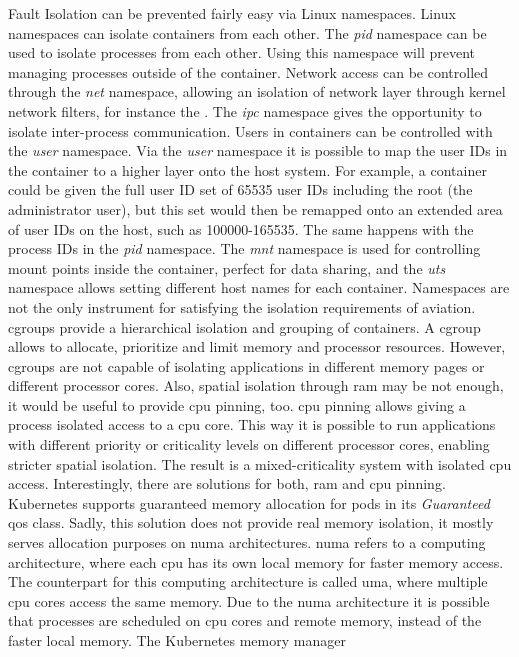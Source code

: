 \documentclass[titlepage]{report}
\begin{document}
Fault Isolation can be prevented fairly easy via Linux namespaces. Linux namespaces can isolate containers from each other. The \emph{pid} namespace can be used to isolate processes from each other. Using this namespace
will prevent managing processes outside of the container. Network access can be controlled through the \emph{net} namespace, allowing an isolation of network layer through kernel network filters, for instance the .
The \emph{ipc} namespace gives the opportunity to isolate inter-process communication. Users in containers can be controlled with the \emph{user} namespace. Via the \emph{user} namespace it is possible to map the user IDs in the container to a higher layer onto the host system. For example, a container could be given the full user ID set of 65535 user IDs including the root (the administrator user), but this set would then be remapped
onto an extended area of user IDs on the host, such as 100000-165535. The same happens with the process IDs in the \emph{pid} namespace. The \emph{mnt} namespace is used for controlling mount points inside the container, perfect
for data sharing, and the \emph{uts} namespace allows setting different host names for each container. Namespaces are not the only instrument for satisfying the isolation requirements of aviation.
\glspl{cgroup} provide a hierarchical isolation and grouping of containers. A \gls{cgroup} allows to allocate, prioritize and limit memory and processor resources. However, \glspl{cgroup} are not capable of isolating applications
in different memory pages or different processor cores. Also, spatial isolation through \gls{ram} may be not enough, it would be useful to provide \gls{cpu} pinning, too. \gls{cpu} pinning allows giving a process isolated access to a \gls{cpu} core. This way it is possible to run applications
with different priority or criticality levels on different processor cores, enabling stricter spatial isolation. The result is a mixed-criticality system with isolated \gls{cpu} access.
Interestingly, there are solutions for both, \gls{ram} and \gls{cpu} pinning. Kubernetes supports guaranteed memory allocation for pods in its \emph{Guaranteed} \gls{qos} class. Sadly,
this solution does not provide real memory isolation, it mostly serves allocation purposes on \gls{numa} architectures\cite{KubernetesNUMA}. \gls{numa} refers to a computing architecture, where
each \gls{cpu} has its own local memory for faster memory access. The counterpart for this computing architecture is called \gls{uma}, where multiple \gls{cpu} cores access the same memory.
Due to the \gls{numa} architecture it is possible that processes are scheduled on \gls{cpu} cores and remote memory, instead of the faster local memory. The Kubernetes memory manager
\end{document}
